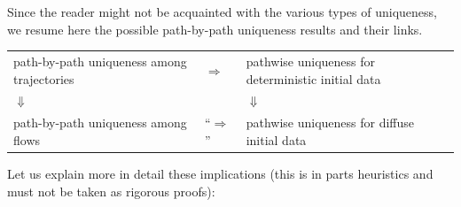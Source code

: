 \documentclass[a4paper,10pt]{article}
\newcommand\1{\mathbbm{1}}
\numberwithin{equation}{section}
\begin{document}
Since the reader might not be acquainted with the various types of uniqueness, we resume here the possible path-by-path uniqueness results and their links.

\setlength{\extrarowheight}{5pt}
\begin{center}
\begin{tabular}{ >{\centering}m{4.5cm} >{\centering}m{2cm}  >{\centering}m{4.5cm} }
path-by-path uniqueness among trajectories & $\Rightarrow$ & pathwise uniqueness for deterministic initial data \tabularnewline
$\Downarrow$ &  \  &  $\Downarrow$ \tabularnewline
path-by-path uniqueness among flows & ``$\Rightarrow$'' & pathwise uniqueness for diffuse initial data
\end{tabular}
\end{center}

Let us explain more in detail these implications (this is in parts heuristics and must not be taken as rigorous proofs):
\end{document}
